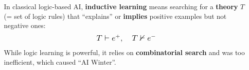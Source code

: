 \begin{preview}
\begin{minipage}{\textwidth}
In classical logic-based AI, \textbf{inductive learning} means searching for a \textbf{theory} $T$ (= set of logic rules) that ``explains'' or \textbf{implies} positive examples but not negative ones:
\begin{equation}
\mbox{\large\(
T \vdash e^{+}, \quad T \nvdash e^{-}
\)}
\end{equation}
While logic learning is powerful, it relies on \textbf{combinatorial search} and was too inefficient, which caused ``AI Winter''.

\end{minipage}
\end{preview}

